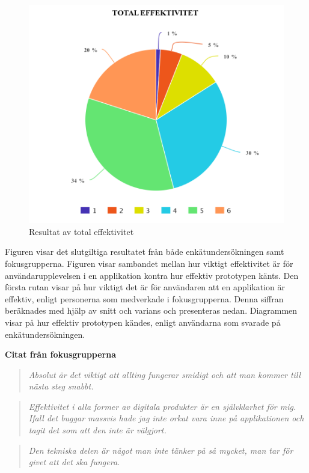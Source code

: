 \begin{figure}[H]
  \centering
  \includegraphics[scale=0.4]{meta-chart-3.png}
  \captionsetup{justification=centering,margin=2cm}
 \caption{Resultat av total effektivitet}
\end{figure} 
Figuren visar det slutgiltiga resultatet från både enkätundersökningen samt fokusgrupperna. Figuren visar sambandet mellan hur viktigt effektivitet är för användarupplevelsen i en applikation kontra hur effektiv prototypen känts. Den första rutan visar på hur viktigt det är för användaren att en applikation är effektiv, enligt personerna som medverkade i fokusgrupperna. Denna siffran beräknades med hjälp av snitt och varians och presenteras nedan. Diagrammen visar på hur effektiv prototypen kändes, enligt användarna som svarade på enkätundersökningen. 

\textbf{Citat från fokusgrupperna}
\begin{quotation}
\em Absolut är det viktigt att allting fungerar smidigt och att man kommer till nästa steg snabbt.
\end{quotation}

\begin{quotation}
\em  Effektivitet i alla former av digitala produkter är en självklarhet för mig. Ifall det buggar massvis hade jag inte orkat vara inne på applikationen och tagit det som att den inte är välgjort.
\end{quotation}

\begin{quotation}
\em Den tekniska delen är något man inte tänker på så mycket, man tar för givet att det ska fungera.
\end{quotation}
